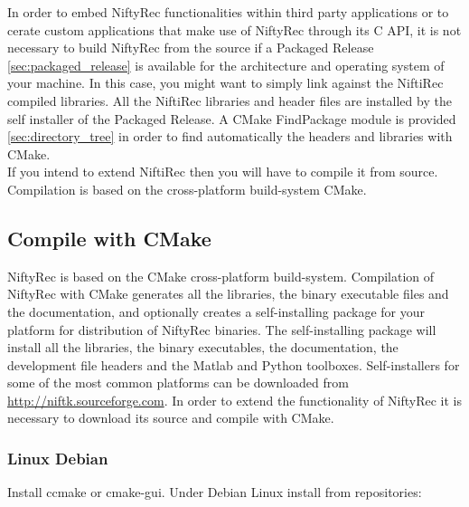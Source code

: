 \documentclass[12pt,a4paper]{report}
\begin{document}
In order to embed NiftyRec functionalities within third party applications or to cerate custom applications 
that make use of NiftyRec through its C API, it is not necessary to build NiftyRec from the source if a Packaged 
Release \ref{sec:packaged_release} is available for the architecture and operating system of your machine. 
In this case, you might want to simply link against the NiftiRec compiled libraries. All the NiftiRec 
libraries and header files are installed by the self installer of the Packaged Release. A CMake FindPackage 
module is provided \ref{sec:directory_tree} in order to find automatically the headers and libraries with CMake.\\

If you intend to extend NiftiRec then you will have to compile it from source. Compilation is based on the 
cross-platform build-system CMake.\\


\subsection{Compile with CMake}
NiftyRec is based on the CMake cross-platform build-system.  
Compilation of NiftyRec with CMake generates all the libraries, the binary executable files and the documentation, 
and optionally creates a self-installing package for your platform for distribution of NiftyRec binaries. 
The self-installing package will install all the libraries, the binary executables, the documentation,  
the development file headers and the Matlab and Python toolboxes. Self-installers for some of the most 
common platforms can be downloaded from \url{http://niftk.sourceforge.com}.
In order to extend the functionality of NiftyRec it is necessary to download its source and compile 
with CMake. 

\subsubsection{Linux Debian}
\noindent Install ccmake or cmake-gui. Under Debian Linux install from repositories: \\
   
\end{document}

